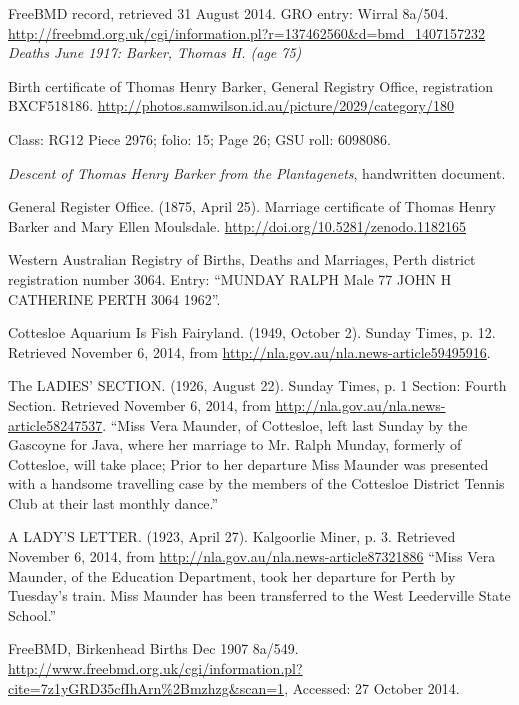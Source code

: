 \begin{thebibliography}{99}
	FreeBMD record, retrieved 31 August 2014. GRO entry: Wirral 8a/504.
	\url{http://freebmd.org.uk/cgi/information.pl?r=137462560&d=bmd_1407157232}
	\emph{Deaths June 1917: Barker, Thomas H. (age 75)}

	Birth certificate of Thomas Henry Barker, General Registry Office, registration BXCF518186.
	\url{http://photos.samwilson.id.au/picture/2029/category/180}

	Class: RG12 Piece 2976; folio: 15; Page 26; GSU roll: 6098086.

	\emph{Descent of Thomas Henry Barker from the Plantagenets},
	handwritten document.

	General Register Office. (1875, April 25). Marriage certificate of Thomas Henry Barker and Mary Ellen Moulsdale.
	\url{http://doi.org/10.5281/zenodo.1182165}

	 Western Australian Registry of Births, Deaths and Marriages, Perth district registration number 3064.
	 Entry: ``MUNDAY RALPH 	Male 	77 	JOHN H 	CATHERINE 		PERTH 	3064 	1962''.

	Cottesloe Aquarium Is Fish Fairyland.
	(1949, October 2). Sunday Times, p. 12. Retrieved November 6, 2014,
	from \url{http://nla.gov.au/nla.news-article59495916}.

	The LADIES' SECTION. (1926, August 22). Sunday Times, p. 1 Section: Fourth Section.
	Retrieved November 6, 2014, from \url{http://nla.gov.au/nla.news-article58247537}.
	``Miss Vera Maunder, of Cottesloe, left last Sunday by the Gascoyne for Java, where her marriage to Mr. Ralph Munday, formerly of Cottesloe, will take place; Prior to her departure Miss Maunder was presented with a handsome travelling case by the members of the Cottesloe District Tennis Club at their last monthly dance.''

	A LADY'S LETTER. (1923, April 27). Kalgoorlie Miner, p. 3.
	Retrieved November 6, 2014, from \url{http://nla.gov.au/nla.news-article87321886}
	``Miss Vera Maunder, of the Education Department, took her departure for Perth by Tuesday's train.
	Miss Maunder has been transferred to the West Leederville State School.''

	FreeBMD, Birkenhead Births Dec 1907 8a/549.
	\url{http://www.freebmd.org.uk/cgi/information.pl?cite=7z1yGRD35cfIhArn\%2Bmzhzg&scan=1}, Accessed: 27 October 2014.


\end{thebibliography}
